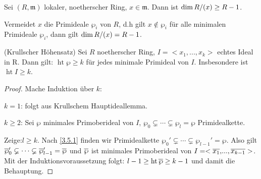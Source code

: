 \documentclass[a4paper,12pt]{scrbook}
\theoremstyle{keinenummern} %
\theoremstyle{mitnummern}
\theoremstyle{unserbeweis}
\newtheorem{proof}{Beweis}
\def\m{\mathfrak{m}}
\newcommand{\hoehe}{\operatorname{ht}}
\renewcommand{\dotsc}{\ensuremath{\!...}}
\def\Bar#1{\ensuremath\overline{#1}}
\newcommand{\Quotient}[2]{
  \mathchoice
  { %
    \raisebox{0.7ex}{\ensuremath{#1}}
    \ensuremath{\mkern-3mu}\big/\ensuremath{\mkern-3mu}
    \raisebox{-0.6ex}{\ensuremath{#2}}
  }
  { %
    #1/#2
  }
  { %
    #1/#2
  }
  { %
    #1/#2
  }
}
\begin{document}
\begin{kor}\label{3.5.2}
Sei $(R,\m)$ lokaler, noetherscher Ring, $x\in \m$. Dann ist $\dim \Quotient{R}{(x)}\ge R-1$.

Vermeidet $x$ die Primideale $\wp_i$ von $R$, d.h gilt $x\notin \wp_i$ für alle minimalen Primideale $\wp_i$, dann gilt $\dim \Quotient{R}{(x)}=R-1$.
\end{kor}

\begin{prop}\label{3.5.3}(Krullscher Höhensatz)
Sei $R$ noetherscher Ring, $I=<x_1,\dotsc,x_k>$ echtes Ideal in R. Dann gilt: $\hoehe \wp\ge k$ für jedes minimale Primideal von $I$. Insbesondere ist $\hoehe I\ge k$.
\end{prop}
\begin{proof} Mache Induktion über $k$:

$k=1$: folgt aus Krullschem Hauptideallemma.

$k\ge 2$: Sei $\wp$ minimales Primoberideal von $I$, $\wp_0\varsubsetneq \dotsm \varsubsetneq \wp_l=\wp$ Primidealkette.

Zeige:$l\ge k$. Nach \cref{3.5.1} finden wir Primidealkette $\wp_0'\varsubsetneq \dotsm \varsubsetneq \wp_{l-1}'=\wp$. Also gilt $\Bar{\wp}_0'\varsubsetneq \dotsm \varsubsetneq \Bar{\wp}_{l-1}'=\Bar{\wp}$ und $\Bar{\wp}$ ist minimales Primoberideal von $I=<\Bar{x_1},\dotsc,\Bar{x_{k-1}}>$. Mit der Induktionsvoraussetzung folgt: $l-1\ge \hoehe \Bar{\wp}\ge k-1$ und damit die Behauptung.
\end{proof}
\end{document}
